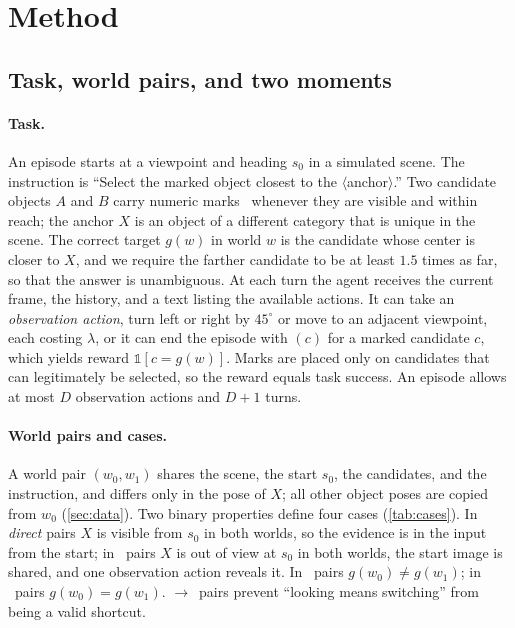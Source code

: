 \section{Method}
\label{sec:method}

\subsection{Task, world pairs, and two moments}
\label{sec:task}

\paragraph{Task.}
An episode starts at a viewpoint and heading $s_0$ in a simulated scene.
The instruction is ``Select the marked object closest to the $\langle$anchor$\rangle$.''
Two candidate objects $A$ and $B$ carry numeric marks~\cite{som2023} whenever they are visible and within reach; the anchor $X$ is an object of a different category that is unique in the scene.
The correct target $g(w)$ in world $w$ is the candidate whose center is closer to $X$, and we require the farther candidate to be at least $1.5$ times as far, so that the answer is unambiguous.
At each turn the agent receives the current frame, the history, and a text listing the available actions.
It can take an \emph{observation action}, \ie turn left or right by $45^\circ$ or move to an adjacent viewpoint, each costing $\lambda$, or it can end the episode with \commit$(c)$ for a marked candidate $c$, which yields reward $\mathbb{1}[c = g(w)]$.
Marks are placed only on candidates that can legitimately be selected, so the reward equals task success.
An episode allows at most $D$ observation actions and $D{+}1$ turns.

\paragraph{World pairs and cases.}
A world pair $(w_0, w_1)$ shares the scene, the start $s_0$, the candidates, and the instruction, and differs only in the pose of $X$; all other object poses are copied from $w_0$ (\cref{sec:data}).
Two binary properties define four cases (\cref{tab:cases}).
In \emph{direct} pairs $X$ is visible from $s_0$ in both worlds, so the evidence is in the input from the start; in \Look\ pairs $X$ is out of view at $s_0$ in both worlds, the start image is shared, and one observation action reveals it.
In \Flip\ pairs $g(w_0) \neq g(w_1)$; in \Stay\ pairs $g(w_0) = g(w_1)$.
\Look$\to$\Stay\ pairs prevent ``looking means switching'' from being a valid shortcut.

